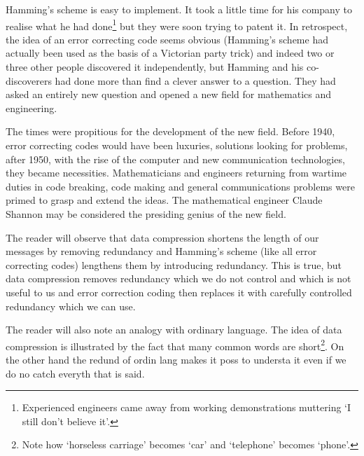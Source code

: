 \documentclass[12pt,a4paper]{article}
\theoremstyle{plain}
\theoremstyle{definition}
\begin{document}
Hamming's scheme is easy to implement. It
took a little time for his company to
realise what he had done\footnote{Experienced engineers
came away from working demonstrations
muttering `I still don't believe it'.}
but they were soon trying to patent it.
In retrospect, the idea of an error correcting
code seems obvious (Hamming's scheme had
actually been used as the basis of a Victorian
party trick) and indeed two or three other
people discovered it independently, but Hamming
and his
co-discoverers had done more than
find a clever answer to a question. They
had asked an entirely new question and
opened a new field for mathematics and engineering.

The times were propitious for the development
of the new field. Before 1940, error correcting
codes would have been luxuries, solutions
looking for problems, after 1950, with the
rise of the computer and new communication
technologies, they became necessities.
Mathematicians and engineers returning
from wartime duties in
code breaking, code making and
general communications problems were
primed to grasp and extend the ideas.
The mathematical engineer
Claude Shannon may be considered the
presiding  genius of the new field.

The reader will observe that data compression 
shortens the length of our messages by
removing redundancy and Hamming's scheme
(like all error correcting codes) lengthens
them by introducing redundancy. This is true,
but  data compression removes redundancy which we
do not control and which is not useful
to us and error correction coding then
replaces it with carefully controlled
redundancy which we can use.

The reader will also note an analogy with ordinary language.
The idea of data compression is illustrated by the
fact that many common words 
are short\footnote{Note how `horseless carriage'
becomes `car' and `telephone' becomes `phone'.}.
On the other hand the redund of ordin lang
makes it poss to understa it even if we do
no catch everyth that is said.
\end{document}
